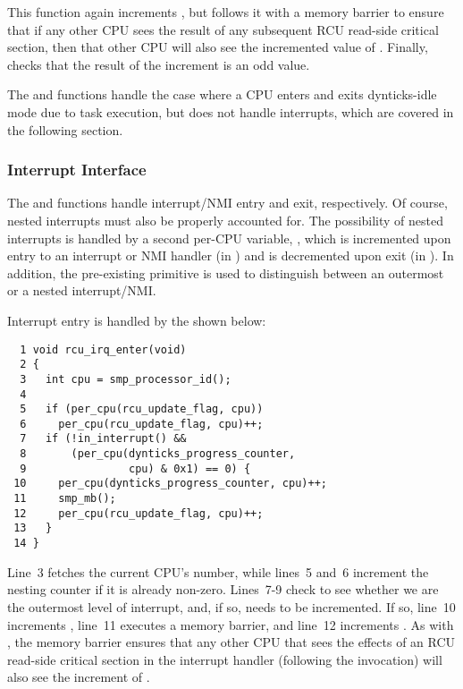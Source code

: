 This function again increments ,
but follows it with a memory barrier to ensure that if any other CPU
sees the result of any subsequent RCU read-side critical section,
then that other CPU will also see the incremented value of
.
Finally,  checks that the result of the
increment is an odd value.

The  and 
functions handle the case where a CPU enters and exits dynticks-idle
mode due to task execution, but does not handle interrupts, which are
covered in the following section.

\subsubsection{Interrupt Interface}
\label{sec:formal:Interrupt Interface}

The  and 
functions handle interrupt/NMI entry and exit, respectively.
Of course, nested interrupts must also be properly accounted for.
The possibility of nested interrupts is handled by a second per-CPU
variable, , which is incremented upon
entry to an interrupt or NMI handler (in )
and is decremented upon exit (in ).
In addition, the pre-existing  primitive is
used to distinguish between an outermost or a nested interrupt/NMI.

Interrupt entry is handled by the 
shown below:

{ \scriptsize
\begin{verbatim}
  1 void rcu_irq_enter(void)
  2 {
  3   int cpu = smp_processor_id();
  4
  5   if (per_cpu(rcu_update_flag, cpu))
  6     per_cpu(rcu_update_flag, cpu)++;
  7   if (!in_interrupt() &&
  8       (per_cpu(dynticks_progress_counter,
  9                cpu) & 0x1) == 0) {
 10     per_cpu(dynticks_progress_counter, cpu)++;
 11     smp_mb();
 12     per_cpu(rcu_update_flag, cpu)++;
 13   }
 14 }
\end{verbatim}
}

Line~3 fetches the current CPU's number, while lines~5 and~6
increment the  nesting counter if it
is already non-zero.
Lines~7-9 check to see whether we are the outermost level of
interrupt, and, if so, 
needs to be incremented.
If so, line~10 increments ,
line~11 executes a memory barrier, and line~12 increments
.
As with , the memory barrier ensures that
any other CPU that sees the effects of an RCU read-side critical section
in the interrupt handler (following the 
invocation) will also see the increment of
.

